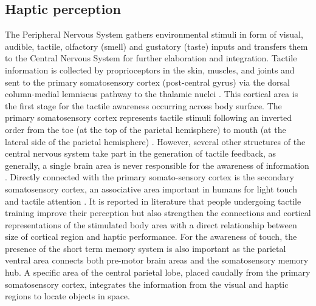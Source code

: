 \documentclass{vgtc}
\begin{document}
\subsection{Haptic perception}
The Peripheral Nervous System gathers environmental stimuli in form of visual, audible, tactile, olfactory (smell) and gustatory (taste) inputs and transfers them to the Central Nervous System for further elaboration and integration. Tactile information is collected by proprioceptors in the skin, muscles, and joints and sent to the primary somatosensory cortex (post-central gyrus) via the dorsal column-medial lemniscus pathway to the thalamic nuclei \cite{Blatow2007}. This cortical area is the first stage for the tactile awareness occurring across body surface. The primary somatosensory cortex represents tactile stimuli following an inverted order from the toe (at the top of the parietal hemisphere) to mouth (at the lateral side of the parietal hemisphere) \cite{Narici1999}. However, several other structures of the central nervous system take part in the generation of tactile feedback, as generally, a single brain area is never responsible for the awareness of information \cite{Manzoni1986}. Directly connected with the primary somato-sensory cortex is the secondary somatosensory cortex, an associative area important in humans for light touch and tactile attention \cite{Eickhoff2005}. It is reported in literature that people undergoing tactile training improve their perception but also strengthen the connections and cortical representations of the stimulated body area \cite{Saito2007} with a direct relationship between size of cortical region and haptic performance. For the awareness of touch, the presence of the short term memory system is also important \cite{Edelman1989} as the parietal ventral area connects both pre-motor brain areas and the somatosensory memory hub. A specific area of the central parietal lobe, placed caudally from the primary somatosensory cortex, integrates the information from the visual and haptic regions to locate objects in space. 
\end{document}
